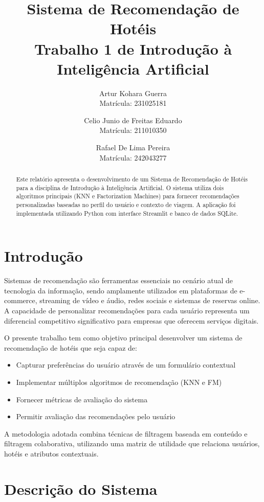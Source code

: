 \documentclass[10pt,twocolumn,letterpaper]{article}
\title{Sistema de Recomendação de Hotéis\\
\large Trabalho 1 de Introdução à Inteligência Artificial}
\author{
Artur Kohara Guerra \\
Matrícula: 231025181 \\
\and
Celio Junio de Freitas Eduardo \\
Matrícula: 211010350 \\
\and
Rafael De Lima Pereira \\
Matrícula: 242043277 \\
}
\begin{document}
\twocolumn[
\begin{@twocolumnfalse}
\maketitle
\thispagestyle{plain}
\end{@twocolumnfalse}
]

\begin{abstract}
Este relatório apresenta o desenvolvimento de um Sistema de Recomendação de Hotéis para a disciplina de Introdução à Inteligência Artificial. O sistema utiliza dois algoritmos principais (KNN e Factorization Machines) para fornecer recomendações personalizadas baseadas no perfil do usuário e contexto de viagem. A aplicação foi implementada utilizando Python com interface Streamlit e banco de dados SQLite.
\end{abstract}

\section{Introdução}

Sistemas de recomendação são ferramentas essenciais no cenário atual de tecnologia da informação, sendo amplamente utilizados em plataformas de e-commerce, streaming de vídeo e áudio, redes sociais e sistemas de reservas online. A capacidade de personalizar recomendações para cada usuário representa um diferencial competitivo significativo para empresas que oferecem serviços digitais.

O presente trabalho tem como objetivo principal desenvolver um sistema de recomendação de hotéis que seja capaz de:
\begin{itemize}
    \item Capturar preferências do usuário através de um formulário contextual
    \item Implementar múltiplos algoritmos de recomendação (KNN e FM)
    \item Fornecer métricas de avaliação do sistema
    \item Permitir avaliação das recomendações pelo usuário
\end{itemize}

A metodologia adotada combina técnicas de filtragem baseada em conteúdo e filtragem colaborativa, utilizando uma matriz de utilidade que relaciona usuários, hotéis e atributos contextuais.

\section{Descrição do Sistema}
\end{document}

